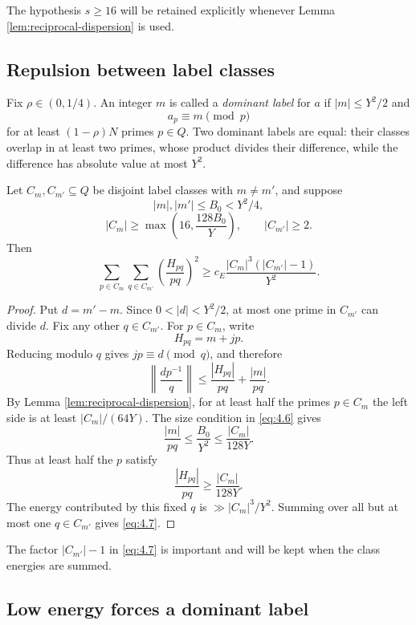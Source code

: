 The hypothesis $s\ge16$ will be retained explicitly whenever Lemma \ref{lem:reciprocal-dispersion} is used.

\subsection{Repulsion between label classes}

Fix $\rho\in(0,1/4)$. An integer $m$ is called a \emph{dominant label} for $a$ if $|m|\le Y^2/2$ and
\[
a_p\equiv m\pmod p
\]
for at least $(1-\rho)N$ primes $p\in Q$. Two dominant labels are equal: their classes overlap in at least two primes, whose product divides their difference, while the difference has absolute value at most $Y^2$.

\begin{lemma}\label{lem:cross-label}
Let $C_m,C_{m'}\subseteq Q$ be disjoint label classes with $m\ne m'$, and suppose
\[
|m|,|m'|\le B_0<Y^2/4,
\]
\[
|C_m|\ge\max\left(16,\frac{128B_0}{Y}\right),
\qquad
|C_{m'}|\ge2.
\tag{4.6}\label{eq:4.6}
\]
Then
\[
\sum_{p\in C_m}
\sum_{q\in C_{m'}}
\left(\frac{H_{pq}}{pq}\right)^2
\ge
c_E\frac{|C_m|^3(|C_{m'}|-1)}{Y^2}.
\tag{4.7}\label{eq:4.7}
\]
\end{lemma}

\begin{proof}
Put $d=m'-m$. Since $0<|d|<Y^2/2$, at most one prime in $C_{m'}$ can divide $d$. Fix any other $q\in C_{m'}$. For $p\in C_m$, write
\[
H_{pq}=m+jp.
\]
Reducing modulo $q$ gives $jp\equiv d\pmod q$, and therefore
\[
\left\|\frac{dp^{-1}}q\right\|
\le
\frac{|H_{pq}|}{pq}+\frac{|m|}{pq}.
\tag{4.8}\label{eq:4.8}
\]
By Lemma \ref{lem:reciprocal-dispersion}, for at least half the primes $p\in C_m$ the left side is at least $|C_m|/(64Y)$. The size condition in \eqref{eq:4.6} gives
\[
\frac{|m|}{pq}
\le
\frac{B_0}{Y^2}
\le
\frac{|C_m|}{128Y}.
\]
Thus at least half the $p$ satisfy
\[
\frac{|H_{pq}|}{pq}
\ge
\frac{|C_m|}{128Y}.
\]
The energy contributed by this fixed $q$ is $\gg |C_m|^3/Y^2$. Summing over all but at most one $q\in C_{m'}$ gives \eqref{eq:4.7}.
\end{proof}

The factor $|C_{m'}|-1$ in \eqref{eq:4.7} is important and will be kept when the class energies are summed.

\subsection{Low energy forces a dominant label}

